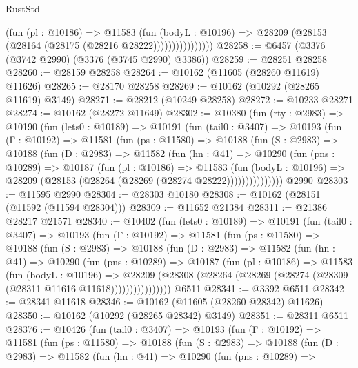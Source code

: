 \begin{lexlean}{RustStd}
\begin{coremodule}
                        (fun (pl : @10186) =>
                        @11583
                          (fun (bodyL : @10196) =>
                          @28209 (@28153 (@28164 (@28175 (@28216 @28222))))))))))))))))
@28258 := @6457 (@3376 (@3742 @2990) (@3376 (@3745 @2990) @3386))
@28259 := @28251 @28258
@28260 := @28159 @28258
@28264 := @10162 (@11605 (@28260 @11619) @11626)
@28265 := @28170 @28258
@28269 := @10162 (@10292 (@28265 @11619) @3149)
@28271 := @28212 (@10249 @28258)
@28272 := @10233 @28271
@28274 := @10162 (@28272 @11649)
@28302 := @10380
    (fun (rty : @2983) =>
    @10190
      (fun (lets0 : @10189) =>
      @10191
        (fun (tail0 : @3407) =>
        @10193
          (fun (Γ : @10192) =>
          @11581
            (fun (ps : @11580) =>
            @10188
              (fun (S : @2983) =>
              @10188
                (fun (D : @2983) =>
                @11582
                  (fun (hn : @41) =>
                  @10290
                    (fun (pns : @10289) =>
                    @10187
                      (fun (pl : @10186) =>
                      @11583
                        (fun (bodyL : @10196) =>
                        @28209 (@28153 (@28264 (@28269 (@28274 @28222)))))))))))))))
    @2990
@28303 := @11595 @2990
@28304 := @28303 @10180
@28308 := @10162 (@28151 (@11592 (@11594 @28304)))
@28309 := @11652 @21384
@28311 := @21386 @28217 @21571
@28340 := @10402
    (fun (lets0 : @10189) =>
    @10191
      (fun (tail0 : @3407) =>
      @10193
        (fun (Γ : @10192) =>
        @11581
          (fun (ps : @11580) =>
          @10188
            (fun (S : @2983) =>
            @10188
              (fun (D : @2983) =>
              @11582
                (fun (hn : @41) =>
                @10290
                  (fun (pns : @10289) =>
                  @10187
                    (fun (pl : @10186) =>
                    @11583
                      (fun (bodyL : @10196) =>
                      @28209
                        (@28308
                          (@28264 (@28269 (@28274 (@28309 (@28311 @11616 @11618))))))))))))))))
    @6511
@28341 := @3392 @6511
@28342 := @28341 @11618
@28346 := @10162 (@11605 (@28260 @28342) @11626)
@28350 := @10162 (@10292 (@28265 @28342) @3149)
@28351 := @28311 @6511
@28376 := @10426
    (fun (tail0 : @3407) =>
    @10193
      (fun (Γ : @10192) =>
      @11581
        (fun (ps : @11580) =>
        @10188
          (fun (S : @2983) =>
          @10188
            (fun (D : @2983) =>
            @11582
              (fun (hn : @41) =>
              @10290
                (fun (pns : @10289) =>

\end{coremodule}
\end{lexlean}
